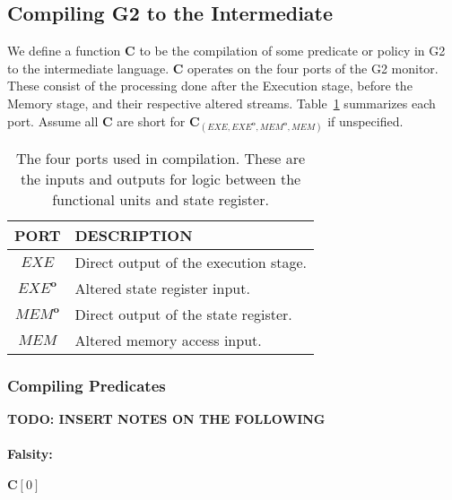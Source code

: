 \documentclass[sigconf,usenames,dvipsnames,svgnames,table]{acmart}
\newcommand{\shdtt}[1]{\sethlcolor{MyLightGrey}\texttt{\hl{#1}}}
\newcommand{\obf}[1]{#1^\mathbf{o}}
\def \sysname {\textsc{G2}\xspace}
\begin{document}
    \subsection{Compiling \sysname to the Intermediate}\label{sec:comp:comp}
      We define a function $\mathbf{C}$ to be the compilation of some predicate or policy in \sysname to the intermediate language.
      $\mathbf{C}$ operates on the four ports of the \sysname monitor.
      These consist of the processing done after the Execution stage, before the Memory stage, and their respective altered streams.
      Table~\ref{tab:comp:comp:ports} summarizes each port.
      Assume all $\mathbf{C}$ are short for $\mathbf{C}_{(EXE,\obf{EXE},\obf{MEM},MEM)}$ if unspecified.
      \begin{table}
        \centering
        \begin{tabular}{c | l}
          PORT        & DESCRIPTION \\ \hline
          $EXE$       & Direct output of the execution stage. \\
          $\obf{EXE}$ & Altered state register input. \\
          $\obf{MEM}$ & Direct output of the state register. \\
          $MEM$       & Altered memory access input. 
        \end{tabular}
        \caption{
          The four ports used in compilation.
          These are the inputs and outputs for logic between the functional units and state register.
        }
        \label{tab:comp:comp:ports}
      \end{table}

      \subsubsection{Compiling Predicates}\label{sec:comp:comp:pred}

        \textbf{TODO: INSERT NOTES ON THE FOLLOWING}

        \paragraph{Falsity:}
          $\mathbf{C}[0]$ \par\noindent
\end{document}
